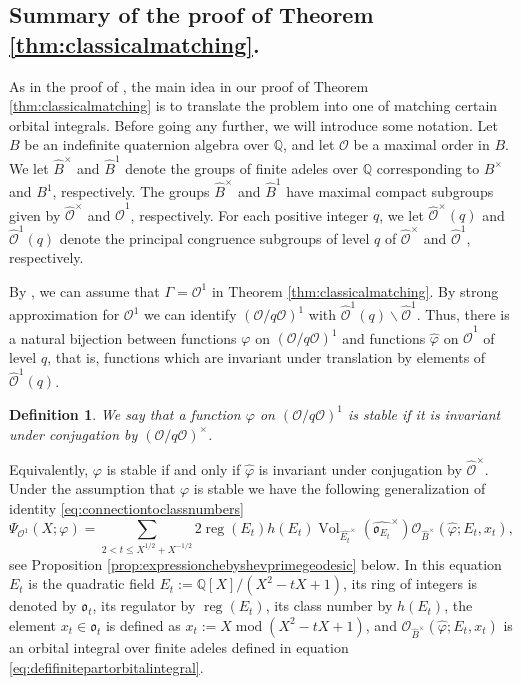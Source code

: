 \documentclass{article}
\newtheorem{defi}[lem]{Definition}
\theoremstyle{named}
\newcommand{\Q}{\mathbb{Q}}
\renewcommand{\O}{\mathcal{O}}
\renewcommand{\o}{\mathfrak{o}}
\DeclareMathOperator{\vol}{Vol}
\DeclareMathOperator{\reg}{reg}
\DeclareMathOperator{\modulo}{mod}
\begin{document}
\subsection{Summary of the proof of Theorem \ref{thm:classicalmatching}.}
As in the proof of \cite[Theorem 1.1]{tang2025}, the main idea
in our proof of Theorem \ref{thm:classicalmatching} is to translate the problem into one of matching certain orbital integrals. Before going any further, we will introduce some notation. Let $B$ be an indefinite quaternion algebra over $\Q$, and let $\O$ be a maximal order in $B$. We let $\widehat{B}^\times$ and $\widehat{B}^1$ denote the groups of finite adeles over $\Q$ corresponding to $B^\times$ and $B^1$, respectively. The groups $\widehat{B}^\times$ and $\widehat{B}^1$ have maximal compact subgroups given by $\widehat{\O}^\times$ and $\widehat{\O}^1$, respectively. For each positive integer $q$, we let $\widehat{\O}^\times(q)$ and $\widehat{\O}^1(q)$ denote the principal congruence subgroups of level $q$ of $\widehat{\O}^\times$ and $\widehat{\O}^1$, respectively. 

By \cite[Lemma 2.1]{reche2026chebotarevgeodesictheoremsplit}, we can assume that $\Gamma = \O^1$ in  
Theorem \ref{thm:classicalmatching}. By strong approximation for $\O^1$ we can identify $(\O/q\O)^1$ with $\widehat{\O}^1(q) \backslash \widehat{\O}^1$. Thus, there is a natural bijection between functions $\varphi$ on $(\O/q\O)^1$ and functions $\widehat{\varphi}$ on $\widehat{\O}^1$ of level $q$, that is, functions which are invariant under translation by elements of $\widehat{\O}^1(q)$.
\begin{defi}\label{defi:stablefunction}
We say that a function $\varphi$ on $(\O/q\O)^1$ is \emph{stable} if it is invariant under conjugation by $(\O/q\O)^\times$. 
\end{defi}
Equivalently, $\varphi$ is stable if and only if $\widehat{\varphi}$ is invariant under conjugation by $\widehat{\O}^\times$. Under the assumption that $\varphi$ is stable we have the following generalization of identity \eqref{eq:connectiontoclassnumbers} 
\begin{equation}\label{eq:approxformula}
    \Psi_{\O^1}(X; \varphi) = \sum_{2 < t \leq X^{1/2} + X^{-1/2}}     2\reg(E_t) h(E_t) \vol_{\widehat{E_t}^\times}(\widehat{\o_{E_t}}^\times)\O_{\widehat{B}^\times}(\widehat{\varphi}; E_t, x_t),
\end{equation}
see Proposition \ref{prop:expressionchebyshevprimegeodesic} below. In this equation $E_t$ is the quadratic field $E_t := \Q[X]/(X^2 - tX + 1)$, its ring of integers is denoted by $\o_t$, its regulator by $\reg(E_t)$, its class number by $h(E_t)$, the element $x_t \in \o_t$ is defined as $x_t := X \modulo (X^2 - tX + 1)$, and $\O_{\widehat{B}^\times}(\widehat{\varphi}; E_t, x_t)$ is an orbital integral over finite adeles defined in equation \eqref{eq:defifinitepartorbitalintegral}.
\end{document}

